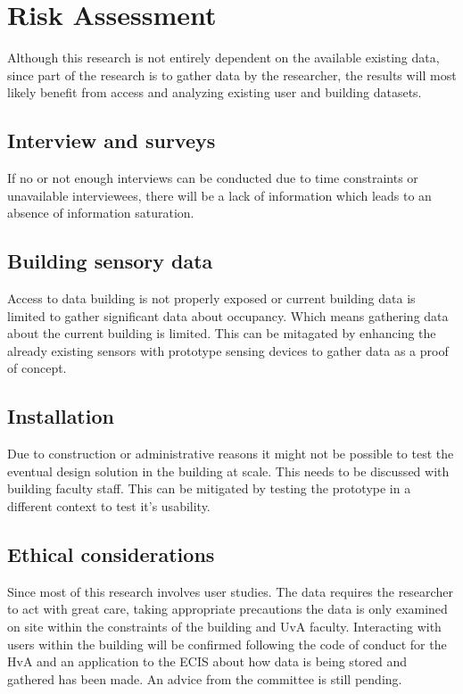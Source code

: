 \section{Risk Assessment}

Although this research is not entirely dependent on the available existing data, since part of the research is to gather data by the researcher, the results will most likely benefit from access and analyzing existing user and building datasets.

\subsection{Interview and surveys}

If no or not enough interviews can be conducted due to time constraints or unavailable interviewees, there will be a lack of information which leads to an absence of information saturation. 

\subsection{Building sensory data}

Access to data building is not properly exposed or current building data is limited to gather significant data about occupancy. Which means gathering data about the current building is limited. This can be mitagated by enhancing the already existing sensors with prototype sensing devices to gather data as a proof of concept.

\subsection{Installation}

Due to construction or administrative reasons it might not be possible to test the eventual design solution in the building at scale. This needs to be discussed with building faculty staff. This can be mitigated by testing the prototype in a different context to test it's usability.

\subsection{Ethical considerations}

Since most of this research involves user studies. The data requires the researcher
to act with great care, taking appropriate precautions the data is only examined on site within the constraints of the building and UvA faculty. Interacting with users within the building will be confirmed following the code of conduct for the HvA and an application to the ECIS about how data is being stored and gathered has been made. An advice from the committee is still pending.